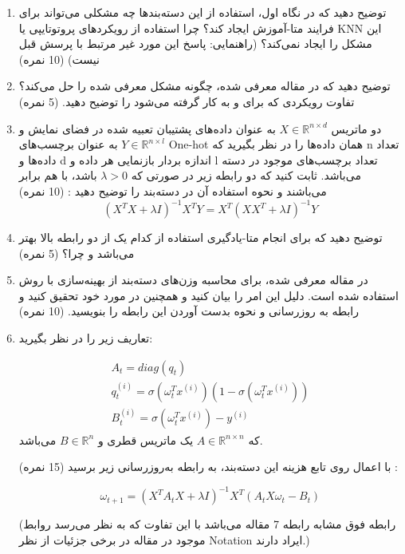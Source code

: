 \documentclass{article}
\begin{document}
\begin{enumerate}
	\item
	توضیح دهید که در نگاه اول، استفاده از این دسته‌بندها چه مشکلی می‌تواند برای فرایند متا-آموزش 
	ایجاد کند؟ چرا استفاده از رویکردهای پروتوتایپی یا KNN این مشکل را ایجاد نمی‌کند؟ (راهنمایی: پاسخ این مورد غیر مرتبط با پرسش قبل نیست) (10 نمره)

	\item
	توضیح دهید که در مقاله معرفی شده، چگونه مشکل معرفی شده را حل می‌کند؟ تفاوت رویکردی که برای
	  و 
	  به کار گرفته می‌شود را توضیح دهید. (5 نمره)
	
	\item
	دو ماتریس
	$X \in {\mathbb{R}^{n \times d}}$
به عنوان داده‌های پشتیبان تعبیه شده در فضای نمایش 	و 
	$Y \in {\mathbb{R}^{n \times l}}$
	به عنوان برچسب‌های One-hot همان داده‌ها 	را در نظر بگیرید که n تعداد داده‌ها و d اندازه بردار باز‌نمایی هر داده و l تعداد برچسب‌های موجود در دسته می‌باشد. ثابت کنید که دو رابطه زیر در صورتی که
	$\lambda  > 0$
	باشد، با هم برابر می‌باشند و نحوه استفاده آن در دسته‌بند 
	 را توضیح دهید : (10 نمره)
	$$
	{\left( {{X^T}X + \lambda I} \right)^{ - 1}}{X^T}Y = {X^T}{\left( {X{X^T} + \lambda I} \right)^{ - 1}}Y
	$$
	
	\item
	توضیح دهید که برای انجام متا-یادگیری استفاده از کدام یک از دو رابطه بالا بهتر می‌باشد و چرا؟ (5 نمره)
	
	\item
	در مقاله معرفی شده، برای محاسبه وزن‌های دسته‌بند
	از بهینه‌سازی با روش 
استفاده شده است. دلیل این امر را بیان کنید و همچنین در مورد خود
	تحقیق کنید و رابطه به روزرسانی و نحوه بدست آوردن این رابطه را بنویسید. (10 نمره)
	
	\item
تعاریف زیر را در نظر بگیرید:

$$
\begin{array}{l}
	{A_t} = diag({q_t})\\
	q_t^{\left( i \right)} = \sigma \left( {\omega _t^T{x^{\left( i \right)}}} \right)\left( {1 - \sigma \left( {\omega _t^T{x^{\left( i \right)}}} \right)} \right)\\
	B_t^{\left( i \right)} = \sigma \left( {\omega _t^T{x^{\left( i \right)}}} \right) - {y^{\left( i \right)}}
\end{array}
$$
که
$A \in {\mathbb{R}^{n \times n}}$
یک ماتریس قطری
و
$B \in {\mathbb{R}^n}$
می‌باشد. 

با اعمال
روی تابع هزینه این دسته‌بند، به رابطه به‌روزرسانی زیر برسید (15 نمره) :

$$
{\omega _{t + 1}} = {\left( {{X^T}{A_t}X + \lambda I} \right)^{ - 1}}{X^T}\left( {{A_t}X{\omega _t} - {B_t}} \right)
$$

(رابطه فوق مشابه رابطه 7 مقاله می‌باشد با این تفاوت که به نظر می‌رسد روابط موجود در مقاله در برخی جزئیات از نظر Notation ایراد دارند.)

\end{enumerate}
\end{document}

